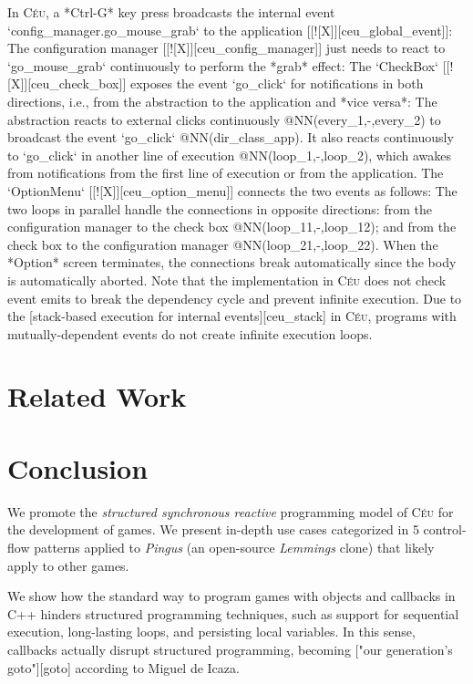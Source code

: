\documentclass{vgtc}                          %
\newcommand{\CEU}{\textsc{C\'{e}u}\xspace}
\begin{document}
In \CEU, a *Ctrl-G* key press broadcasts the internal event
`config\_manager.go\_mouse\_grab` to the application [[![X]][ceu\_global\_event]]:
%
The configuration manager [[![X]][ceu\_config\_manager]] just needs to react to
`go\_mouse\_grab` continuously to perform the *grab* effect:
%
The `CheckBox` [[![X]][ceu\_check\_box]] exposes the event `go\_click` for 
notifications in both directions, i.e., from the abstraction to the application
and *vice versa*:
%
The abstraction reacts to external clicks continuously @NN(every\_1,-,every\_2)
to broadcast the event `go\_click` @NN(dir\_class\_app).
It also reacts continuously to `go\_click` in another line of execution
@NN(loop\_1,-,loop\_2), which awakes from notifications from the first line of
execution or from the application.
%
The `OptionMenu` [[![X]][ceu\_option\_menu]] connects the two events as 
follows:
%
The two loops in parallel handle the connections in opposite directions:
from the configuration manager to the check box @NN(loop\_11,-,loop\_12);
and
from the check box to the configuration manager @NN(loop\_21,-,loop\_22).
%
When the *Option* screen terminates, the connections break automatically since
the body is automatically aborted.
%
Note that the implementation in \CEU does not check event emits to break the
dependency cycle and prevent infinite execution.
Due to the [stack-based execution for internal events][ceu\_stack] in \CEU,
programs with mutually-dependent events do not create infinite execution loops.

\section{Related Work}

\section{Conclusion}

We promote the \emph{structured synchronous reactive} programming model of
\CEU for the development of games.
We present in-depth use cases categorized in 5 control-flow patterns applied to
\emph{Pingus} (an open-source \emph{Lemmings} clone) that likely apply to other
games.

We show how the standard way to program games with objects and callbacks in C++
hinders structured programming techniques, such as support for sequential
execution, long-lasting loops, and persisting local variables.
In this sense, callbacks actually disrupt structured programming, becoming
["our generation’s goto"][goto] according to Miguel de Icaza.
\end{document}
